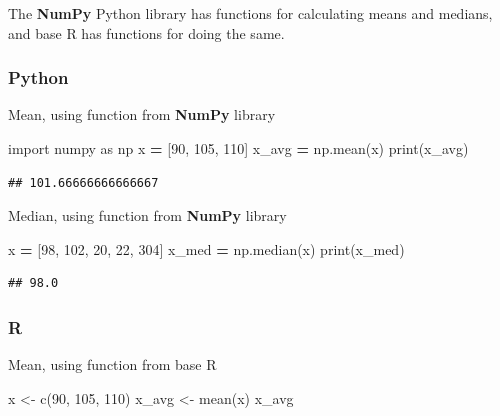 \documentclass[
]{book}
\newenvironment{Shaded}{\begin{snugshade}}{\end{snugshade}}
\newcommand{\BuiltInTok}[1]{#1}
\newcommand{\DecValTok}[1]{\textcolor[rgb]{0.00,0.00,0.81}{#1}}
\newcommand{\FunctionTok}[1]{\textcolor[rgb]{0.00,0.00,0.00}{#1}}
\newcommand{\ImportTok}[1]{#1}
\newcommand{\NormalTok}[1]{#1}
\newcommand{\OperatorTok}[1]{\textcolor[rgb]{0.81,0.36,0.00}{\textbf{#1}}}
\newcommand{\OtherTok}[1]{\textcolor[rgb]{0.56,0.35,0.01}{#1}}
\begin{document}
The \textbf{NumPy} Python library has functions for calculating means and medians, and base R has functions for doing the same.

\hypertarget{python-6}{%
\subsubsection*{Python}\label{python-6}}

Mean, using function from \textbf{NumPy} library

\begin{Shaded}
\begin{Highlighting}[]
\ImportTok{import}\NormalTok{ numpy }\ImportTok{as}\NormalTok{ np}
\NormalTok{x }\OperatorTok{=}\NormalTok{ [}\DecValTok{90}\NormalTok{, }\DecValTok{105}\NormalTok{, }\DecValTok{110}\NormalTok{]}
\NormalTok{x\_avg }\OperatorTok{=}\NormalTok{ np.mean(x)}
\BuiltInTok{print}\NormalTok{(x\_avg)}
\end{Highlighting}
\end{Shaded}

\begin{verbatim}
## 101.66666666666667
\end{verbatim}

Median, using function from \textbf{NumPy} library

\begin{Shaded}
\begin{Highlighting}[]
\NormalTok{x }\OperatorTok{=}\NormalTok{ [}\DecValTok{98}\NormalTok{, }\DecValTok{102}\NormalTok{, }\DecValTok{20}\NormalTok{, }\DecValTok{22}\NormalTok{, }\DecValTok{304}\NormalTok{]}
\NormalTok{x\_med }\OperatorTok{=}\NormalTok{ np.median(x)}
\BuiltInTok{print}\NormalTok{(x\_med)}
\end{Highlighting}
\end{Shaded}

\begin{verbatim}
## 98.0
\end{verbatim}

\hypertarget{r-6}{%
\subsubsection*{R}\label{r-6}}

Mean, using function from base R

\begin{Shaded}
\begin{Highlighting}[]
\NormalTok{x }\OtherTok{\textless{}{-}} \FunctionTok{c}\NormalTok{(}\DecValTok{90}\NormalTok{, }\DecValTok{105}\NormalTok{, }\DecValTok{110}\NormalTok{)}
\NormalTok{x\_avg }\OtherTok{\textless{}{-}} \FunctionTok{mean}\NormalTok{(x)}
\NormalTok{x\_avg}
\end{Highlighting}
\end{Shaded}
\end{document}
